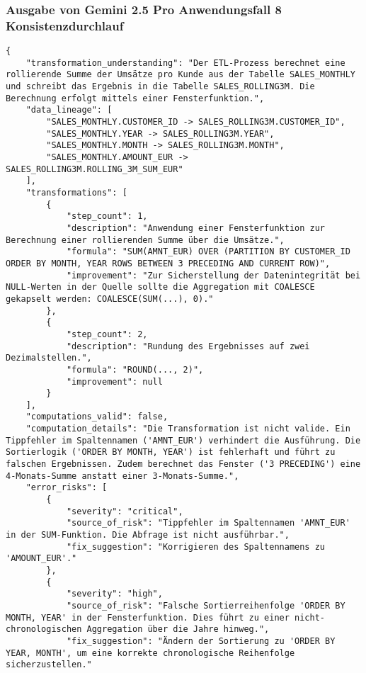 \subsubsection{Ausgabe von Gemini 2.5 Pro Anwendungsfall 8 Konsistenzdurchlauf}\label{anhang:subsubsec:gemini_case8_prompt2}
\begin{lstlisting}[caption={Ausgabe: Gemini 2.5 Pro Anwendungsfall 8 Konsistenzdurchlauf},label={gemini_case8_prompt2}]
{
    "transformation_understanding": "Der ETL-Prozess berechnet eine rollierende Summe der Umsätze pro Kunde aus der Tabelle SALES_MONTHLY und schreibt das Ergebnis in die Tabelle SALES_ROLLING3M. Die Berechnung erfolgt mittels einer Fensterfunktion.",
    "data_lineage": [
        "SALES_MONTHLY.CUSTOMER_ID -> SALES_ROLLING3M.CUSTOMER_ID",
        "SALES_MONTHLY.YEAR -> SALES_ROLLING3M.YEAR",
        "SALES_MONTHLY.MONTH -> SALES_ROLLING3M.MONTH",
        "SALES_MONTHLY.AMOUNT_EUR -> SALES_ROLLING3M.ROLLING_3M_SUM_EUR"
    ],
    "transformations": [
        {
            "step_count": 1,
            "description": "Anwendung einer Fensterfunktion zur Berechnung einer rollierenden Summe über die Umsätze.",
            "formula": "SUM(AMNT_EUR) OVER (PARTITION BY CUSTOMER_ID ORDER BY MONTH, YEAR ROWS BETWEEN 3 PRECEDING AND CURRENT ROW)",
            "improvement": "Zur Sicherstellung der Datenintegrität bei NULL-Werten in der Quelle sollte die Aggregation mit COALESCE gekapselt werden: COALESCE(SUM(...), 0)."
        },
        {
            "step_count": 2,
            "description": "Rundung des Ergebnisses auf zwei Dezimalstellen.",
            "formula": "ROUND(..., 2)",
            "improvement": null
        }
    ],
    "computations_valid": false,
    "computation_details": "Die Transformation ist nicht valide. Ein Tippfehler im Spaltennamen ('AMNT_EUR') verhindert die Ausführung. Die Sortierlogik ('ORDER BY MONTH, YEAR') ist fehlerhaft und führt zu falschen Ergebnissen. Zudem berechnet das Fenster ('3 PRECEDING') eine 4-Monats-Summe anstatt einer 3-Monats-Summe.",
    "error_risks": [
        {
            "severity": "critical",
            "source_of_risk": "Tippfehler im Spaltennamen 'AMNT_EUR' in der SUM-Funktion. Die Abfrage ist nicht ausführbar.",
            "fix_suggestion": "Korrigieren des Spaltennamens zu 'AMOUNT_EUR'."
        },
        {
            "severity": "high",
            "source_of_risk": "Falsche Sortierreihenfolge 'ORDER BY MONTH, YEAR' in der Fensterfunktion. Dies führt zu einer nicht-chronologischen Aggregation über die Jahre hinweg.",
            "fix_suggestion": "Ändern der Sortierung zu 'ORDER BY YEAR, MONTH', um eine korrekte chronologische Reihenfolge sicherzustellen."

\end{lstlisting}
